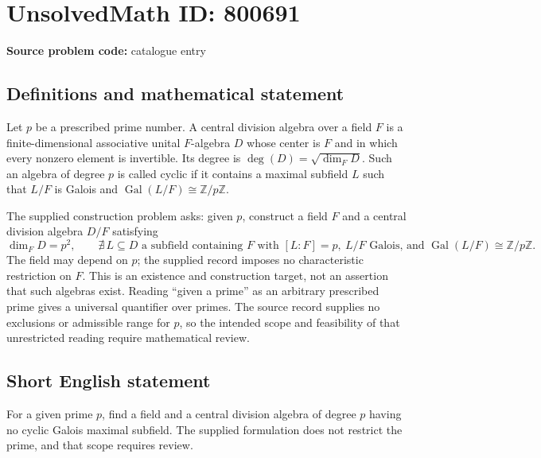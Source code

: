 \documentclass[11pt]{article}
\newcommand{\Z}{\mathbb{Z}}
\begin{document}
\section*{UnsolvedMath ID: 800691}
\textbf{Source problem code:} catalogue entry
\subsection{Definitions and mathematical statement}
Let \(p\) be a prescribed prime number. A central division algebra over a field \(F\) is a finite-dimensional associative unital \(F\)-algebra \(D\) whose center is \(F\) and in which every nonzero element is invertible. Its degree is \(\deg(D)=\sqrt{\dim_F D}\). Such an algebra of degree \(p\) is called cyclic if it contains a maximal subfield \(L\) such that \(L/F\) is Galois and \(\operatorname{Gal}(L/F)\cong\Z/p\Z\).

The supplied construction problem asks: given \(p\), construct a field \(F\) and a central division algebra \(D/F\) satisfying
\[
\dim_F D=p^2,
\qquad
\nexists\, L\subseteq D\text{ a subfield containing }F
\text{ with }[L:F]=p,\ L/F\text{ Galois, and }
\operatorname{Gal}(L/F)\cong\Z/p\Z.
\]
The field may depend on \(p\); the supplied record imposes no characteristic restriction on \(F\). This is an existence and construction target, not an assertion that such algebras exist. Reading ``given a prime'' as an arbitrary prescribed prime gives a universal quantifier over primes. The source record supplies no exclusions or admissible range for \(p\), so the intended scope and feasibility of that unrestricted reading require mathematical review.
\subsection{Short English statement}
For a given prime \(p\), find a field and a central division algebra of degree \(p\) having no cyclic Galois maximal subfield. The supplied formulation does not restrict the prime, and that scope requires review.
\end{document}
